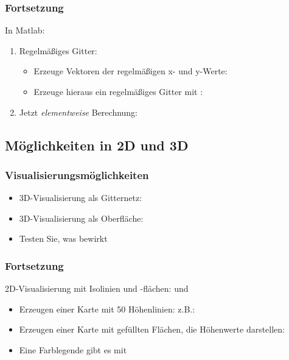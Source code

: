     \begin{frame}
        \frametitle{Fortsetzung}
        In Matlab:
        \begin{enumerate}
            \item Regelmäßiges Gitter:
            \begin{itemize}
                \item Erzeuge Vektoren der regelmäßigen x- und y-Werte: 
                \item Erzeuge hieraus ein regelmäßiges Gitter mit : 
            \end{itemize}
            \item Jetzt \textit{elementweise} Berechnung: 
        \end{enumerate}
    \end{frame}

    \subsection{Möglichkeiten in 2D und 3D}
    \begin{frame}
        \frametitle{Visualisierungsmöglichkeiten}
        \begin{itemize}
            \item 3D-Visualisierung als Gitternetz: 
            \item 3D-Visualisierung als Oberfläche: 
            \item Testen Sie, was  bewirkt
        \end{itemize}
    \end{frame}

    \begin{frame}
        \frametitle{Fortsetzung}
        2D-Visualisierung mit Isolinien und -flächen:  und 
        \begin{itemize}
            \item Erzeugen einer Karte mit 50 Höhenlinien: z.B.: 
            \item Erzeugen einer Karte mit gefüllten Flächen, die Höhenwerte darstellen: 
            \item Eine Farblegende gibt es mit 
        \end{itemize}
    \end{frame}

